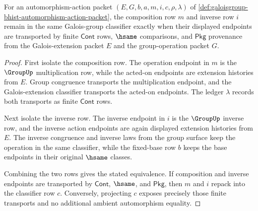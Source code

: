 \begin{theorem}
\label{thm:galoisgroup-composition-and-inverse-obligation}
For an automorphism-action packet $(E,G,b,a,m,i,c,\rho,\lambda)$ of
\autoref{def:galoisgroup-bhist-automorphism-action-packet}, the composition
row $m$ and inverse row $i$ remain in the same Galois-group classifier exactly
when their displayed endpoints are transported by finite $\mathsf{Cont}$ rows,
$\hsame$ comparisons, and $\mathsf{Pkg}$ provenance from the Galois-extension
packet $E$ and the group-operation packet $G$.
\end{theorem}
\begin{proof}
First isolate the composition row. The operation endpoint in $m$ is the
$\GroupUp$ multiplication row, while the acted-on endpoints are extension
histories from $E$. Group congruence transports the multiplication endpoint,
and the Galois-extension classifier transports the acted-on endpoints. The
ledger $\lambda$ records both transports as finite $\mathsf{Cont}$ rows.

Next isolate the inverse row. The inverse endpoint in $i$ is the $\GroupUp$
inverse row, and the inverse action endpoints are again displayed extension
histories from $E$. The inverse congruence and inverse laws from the group
surface keep the operation in the same classifier, while the fixed-base row
$b$ keeps the base endpoints in their original $\hsame$ classes.

Combining the two rows gives the stated equivalence. If composition and
inverse endpoints are transported by $\mathsf{Cont}$, $\hsame$, and
$\mathsf{Pkg}$, then $m$ and $i$ repack into the classifier row $c$.
Conversely, projecting $c$ exposes precisely those finite transports and no
additional ambient automorphism equality.
\end{proof}

